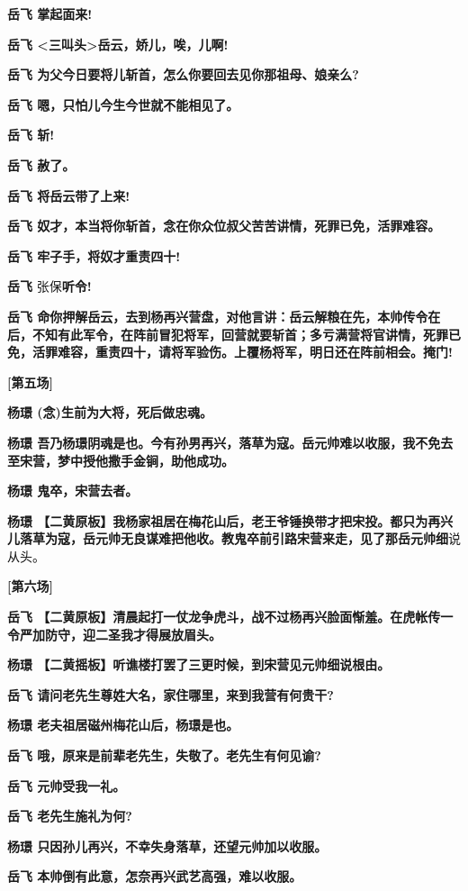 \textbf{岳飞 掌起面来!}

\textbf{岳飞 \textless{}三叫头\textgreater{}岳云，娇儿，唉，儿啊!}

\textbf{岳飞 为父今日要将儿斩首，怎么你要回去见你那祖母、娘亲么?}

\textbf{岳飞 嗯，只怕儿今生今世就不能相见了。}

\textbf{岳飞 斩!}

\textbf{岳飞 赦了。}

\textbf{岳飞 将岳云带了上来!}

\textbf{岳飞
奴才，本当将你斩首，念在你众位叔父苦苦讲情，死罪已免，活罪难容。}

\textbf{岳飞 牢子手，将奴才重责四十!}

\textbf{岳飞} 张保\textbf{听令!}

\textbf{岳飞
命你押解岳云，去到杨再兴营盘，对他言讲：岳云解粮在先，本帅传令在后，不知有此军令，在阵前冒犯将军，回营就要斩首；多亏满营将官讲情，死罪已免，活罪难容，重责四十，请将军验伤。上覆杨将军，明日还在阵前相会。掩门!}

\textbf{{[}第五场{]}}

\textbf{杨璟 (念)生前为大将，死后做忠魂。}

\textbf{杨璟
吾乃杨璟阴魂是也。今有孙男再兴，落草为寇。岳元帅难以收服，我不免去至宋营，梦中授他撒手金锏，助他成功。}

\textbf{杨璟 鬼卒，宋营去者。}

\textbf{杨璟
【二黄原板】我杨家祖居在梅花山后，老王爷锤换带才把宋投。都只为再兴儿落草为寇，岳元帅无良谋难把他收。教鬼卒前引路宋营来走，见了那岳元帅细}说从头。

\textbf{{[}第六场{]}}

\textbf{岳飞
【二黄原板】清晨起打一仗龙争虎斗，战不过杨再兴脸面惭羞。在虎帐传一令严加防守，迎二圣我才得展放眉头。}

\textbf{杨璟 【二黄摇板】听谯楼打罢了三更时候，到宋营见元帅细说根由。}

\textbf{岳飞 请问老先生尊姓大名，家住哪里，来到我营有何贵干?}

\textbf{杨璟 老夫祖居磁州梅花山后，杨璟是也。}

\textbf{岳飞 哦，原来是前辈老先生，失敬了。老先生有何见谕?}

\textbf{岳飞 元帅受我一礼。}

\textbf{岳飞 老先生施礼为何?}

\textbf{杨璟 只因孙儿再兴，不幸失身落草，还望元帅加以收服。}

\textbf{岳飞 本帅倒有此意，怎奈再兴武艺高强，难以收服。}

